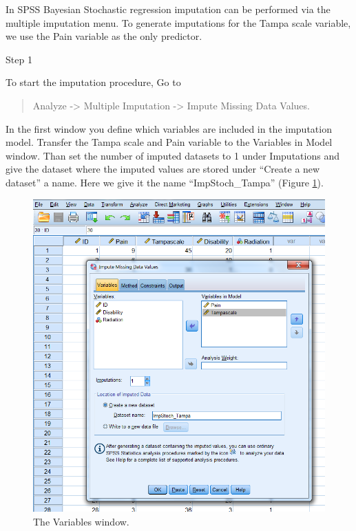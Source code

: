 \documentclass[]{book}
\theoremstyle{definition}
\theoremstyle{definition}
\theoremstyle{definition}
\theoremstyle{remark}
\begin{document}
In SPSS Bayesian Stochastic regression imputation can be performed via
the multiple imputation menu. To generate imputations for the Tampa
scale variable, we use the Pain variable as the only predictor.

Step 1

To start the imputation procedure, Go to

\begin{quote}
Analyze -\textgreater{} Multiple Imputation -\textgreater{} Impute
Missing Data Values.
\end{quote}

In the first window you define which variables are included in the
imputation model. Transfer the Tampa scale and Pain variable to the
Variables in Model window. Than set the number of imputed datasets to 1
under Imputations and give the dataset where the imputed values are
stored under ``Create a new dataset'' a name. Here we give it the name
``ImpStoch\_Tampa'' (Figure \ref{fig:fig3-18}).

\begin{figure}

{\centering \includegraphics[width=0.9\linewidth]{images/fig3.18} 

}

\caption{The Variables window.}\label{fig:fig3-18}
\end{figure}
\end{document}
